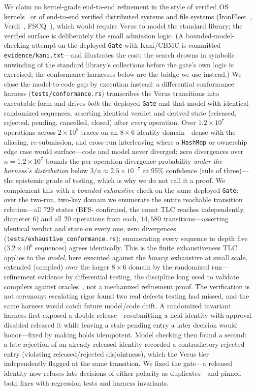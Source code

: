\documentclass[10pt,journal,compsoc]{IEEEtran}
\begin{document}
We claim no kernel-grade end-to-end refinement in the style of verified
OS kernels~\cite{sel4} or of end-to-end verified distributed systems and
file systems (IronFleet~\cite{ironfleet15}, Verdi~\cite{verdi15},
FSCQ~\cite{fscq15}), which would require Verus to model the standard
library; the verified surface is deliberately the small admission logic. (A bounded-model-checking attempt on the deployed \texttt{Gate} with Kani/CBMC is committed---\texttt{evidence/kani.txt}---and illustrates the cost: the search drowns in symbolic unwinding of the standard library's collections before the gate's own logic is exercised; the conformance harnesses below are the bridge we use instead.) We
close the model-to-code gap by execution instead: a differential conformance
harness (\texttt{tests/conformance.rs}) transcribes the Verus transitions into
executable form and drives \emph{both} the deployed \texttt{Gate} and that model
with identical randomized sequences, asserting identical verdict and derived
state (released, rejected, pending, cancelled, closed) after \emph{every}
operation. Over $1.2\times10^{7}$ operations across $2\times10^{5}$ traces on an
$8{\times}6$ identity domain---dense with the aliasing, re-submission, and
cross-run interleaving where a \texttt{HashMap} or ownership edge case would
surface---code and model never diverged; zero divergences over
$n{=}1.2\times10^{7}$ bounds the per-operation divergence probability
\emph{under the harness's distribution} below $3/n\approx2.5\times10^{-7}$ at
95\% confidence (rule of three)---the epistemic grade of testing, which is why
we do not call it a proof. We complement this with a \emph{bounded-exhaustive}
check on the same deployed \texttt{Gate}: over the two-run, two-key domain we
enumerate the entire reachable transition relation---all $729$ states (BFS-%
confirmed, the count TLC reaches independently, diameter $6$) and all $20$
operations from each, $14{,}580$ transitions---asserting identical verdict and
state on every one, zero divergences (\texttt{tests/exhaustive\_conformance.rs});
enumerating every sequence to depth five ($3.2\times10^{6}$ sequences) agrees
identically. This is the finite exhaustiveness TLC applies to the \emph{model},
here executed against the \emph{binary}: exhaustive at small scale, extended
(sampled) over the larger $8{\times}6$ domain by the randomized run---refinement
evidence by differential testing, the discipline long used to validate compilers
against oracles~\cite{mckeeman98,csmith11}, not a mechanized refinement proof.
The verification is not ceremony: escalating rigor found two real defects
testing had missed, and the same harness would catch future model/code drift. A
randomized invariant harness first exposed a double-release---resubmitting a
held identity with approval disabled released it while leaving a stale pending
entry a later decision would honor---fixed by making holds idempotent. Model
checking then found a second: a late rejection of an already-released identity
recorded a contradictory rejected entry (violating released/rejected
disjointness), which the Verus tier independently flagged at the same
transition. We fixed the gate---a released identity now refuses late decisions
of either polarity as duplicates---and pinned both fixes with regression tests
and harness invariants.
\end{document}
